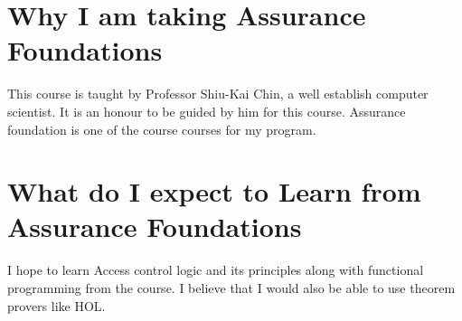 \documentclass[11]{article}
\begin{document}
\section{Why I am taking Assurance Foundations}
This course is taught by Professor Shiu-Kai Chin, a well establish computer scientist. It is an honour to be guided by him for this course. Assurance foundation is one of the course courses for my program.


\section{What do I expect to Learn from Assurance Foundations}
I hope to learn Access control logic and its principles along with functional programming from the course.
I believe that I would also be able to use theorem provers like HOL.
\end{document}
